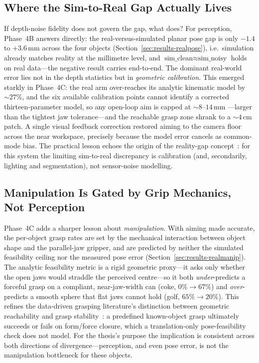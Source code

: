 \subsection{Where the Sim-to-Real Gap Actually Lives}
\label{sec:disc-gap}
If depth-noise fidelity does not govern the gap, what does? For perception,
Phase~4B answers directly: the real-versus-simulated planar pose gap is only
$-1.4$ to $+3.6$\,mm across the four objects (Section~\ref{sec:results-realpose}),
i.e.\ simulation already matches reality at the millimetre level, and
$\text{sim\_clean} \approx \text{sim\_noisy}$ holds on real data---the negative
result carries end-to-end. The dominant real-world error lies not in the depth
statistics but in \emph{geometric calibration}. This emerged starkly in
Phase~4C: the real arm over-reaches its analytic kinematic model by ${\sim}27\%$,
and the six available calibration points cannot identify a corrected
thirteen-parameter model, so any open-loop aim is capped at ${\sim}8$--$14$\,mm
---larger than the tightest jaw tolerance---and the reachable grasp zone shrank
to a ${\sim}4$\,cm patch. A single visual feedback correction restored aiming to
the camera floor across the near workspace, precisely because the model error
cancels as common-mode bias. The practical lesson echoes the origin of the
reality-gap concept~\cite{jakobi1995noise}: for this system the limiting
sim-to-real discrepancy is calibration (and, secondarily, lighting and
segmentation), not sensor-noise modelling.

\subsection{Manipulation Is Gated by Grip Mechanics, Not Perception}
\label{sec:disc-grip}
Phase~4C adds a sharper lesson about \emph{manipulation}. With aiming made
accurate, the per-object grasp rates are set by the mechanical interaction
between object shape and the parallel-jaw gripper, and are predicted by neither
the simulated feasibility ceiling nor the measured pose error
(Section~\ref{sec:results-realmanip}). The analytic feasibility metric is a
rigid geometric proxy---it asks only whether the open jaws would straddle the
perceived centre---so it both \emph{under}-predicts a forceful grasp on a
compliant, near-jaw-width can (coke, $0\% \to 67\%$) and \emph{over}-predicts a
smooth sphere that flat jaws cannot hold (golf, $65\% \to 20\%$). This refines
the data-driven grasping literature's distinction between geometric reachability
and grasp stability~\cite{bohg2014grasp}: a predefined known-object grasp
ultimately succeeds or fails on form/force closure, which a translation-only
pose-feasibility check does not model. For the thesis's purpose the implication
is consistent across both directions of divergence---perception, and even pose
error, is not the manipulation bottleneck for these objects.

